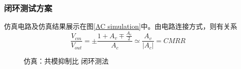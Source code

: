 \documentclass[UTF8]{ctexart}
\numberwithin{figure}{subsection}
\numberwithin{table}{subsection}
\numberwithin{equation}{subsection}
\begin{document}
\subsubsection{闭环测试方案}
仿真电路及仿真结果展示在图\ref{AC simulation}中。由电路连接方式，则有关系
\[\frac{V_{cm}}{V_{out}} = \pm \frac{1+A_v \mp \frac{A_c}{2}}{A_c} \simeq \frac{A_v}{|A_c|} = CMRR\]

\begin{figure}[H]
    \centering
    \caption{仿真：共模抑制比 闭环测法}
    \label{CMRR closed simulation}
\end{figure}
\end{document}

